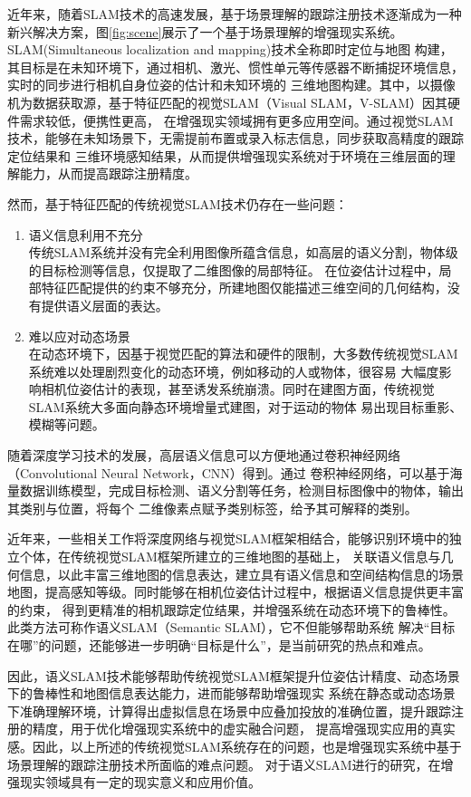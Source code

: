 近年来，随着SLAM技术的高速发展，基于场景理解的跟踪注册技术逐渐成为一种新兴解决方案，图\ref{fig:scene}展示了一个基于场景理解的增强现实系统。SLAM(Simultaneous localization and mapping)技术全称即时定位与地图
构建，其目标是在未知环境下，通过相机、激光、惯性单元等传感器不断捕捉环境信息，实时的同步进行相机自身位姿的估计和未知环境的
三维地图构建。其中，以摄像机为数据获取源，基于特征匹配的视觉SLAM（Visual SLAM，V-SLAM）因其硬件需求较低，便携性更高，
在增强现实领域拥有更多应用空间。通过视觉SLAM技术，能够在未知场景下，无需提前布置或录入标志信息，同步获取高精度的跟踪定位结果和
三维环境感知结果，从而提供增强现实系统对于环境在三维层面的理解能力，从而提高跟踪注册精度。

然而，基于特征匹配的传统视觉SLAM技术仍存在一些问题：
{
\setlist[enumerate]{}%
\begin{enumerate}[nosep]
    \item 语义信息利用不充分\\传统SLAM系统并没有完全利用图像所蕴含信息，如高层的语义分割，物体级的目标检测等信息，仅提取了二维图像的局部特征。
    在位姿估计过程中，局部特征匹配提供的约束不够充分，所建地图仅能描述三维空间的几何结构，没有提供语义层面的表达。
    \item 难以应对动态场景\\在动态环境下，因基于视觉匹配的算法和硬件的限制，大多数传统视觉SLAM系统难以处理剧烈变化的动态环境，例如移动的人或物体，很容易
    大幅度影响相机位姿估计的表现，甚至诱发系统崩溃。同时在建图方面，传统视觉SLAM系统大多面向静态环境增量式建图，对于运动的物体
    易出现目标重影、模糊等问题。
\end{enumerate}
}

随着深度学习技术的发展，高层语义信息可以方便地通过卷积神经网络（Convolutional Neural Network，CNN）得到。通过
卷积神经网络，可以基于海量数据训练模型，完成目标检测、语义分割等任务，检测目标图像中的物体，输出其类别与位置，将每个
二维像素点赋予类别标签，给予其可解释的类别。

近年来，一些相关工作将深度网络与视觉SLAM框架相结合，能够识别环境中的独立个体，在传统视觉SLAM框架所建立的三维地图的基础上，
关联语义信息与几何信息，以此丰富三维地图的信息表达，建立具有语义信息和空间结构信息的场景地图，提高感知等级。同时能够在相机位姿估计过程中，根据语义信息提供更丰富的约束，
得到更精准的相机跟踪定位结果，并增强系统在动态环境下的鲁棒性。此类方法可称作语义SLAM（Semantic SLAM），它不但能够帮助系统
解决“目标在哪”的问题，还能够进一步明确“目标是什么”，是当前研究的热点和难点。

因此，语义SLAM技术能够帮助传统视觉SLAM框架提升位姿估计精度、动态场景下的鲁棒性和地图信息表达能力，进而能够帮助增强现实
系统在静态或动态场景下准确理解环境，计算得出虚拟信息在场景中应叠加投放的准确位置，提升跟踪注册的精度，用于优化增强现实系统中的虚实融合问题，
提高增强现实应用的真实感。因此，以上所述的传统视觉SLAM系统存在的问题，也是增强现实系统中基于场景理解的跟踪注册技术所面临的难点问题。
对于语义SLAM进行的研究，在增强现实领域具有一定的现实意义和应用价值。    


